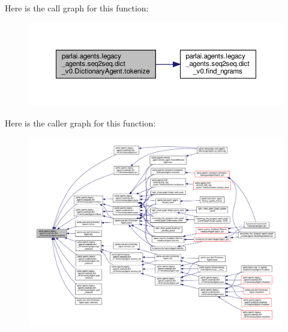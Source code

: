Here is the call graph for this function\+:
\nopagebreak
\begin{figure}[H]
\begin{center}
\leavevmode
\includegraphics[width=350pt]{classparlai_1_1agents_1_1legacy__agents_1_1seq2seq_1_1dict__v0_1_1DictionaryAgent_aa551af633278b71b0a8da65180b79202_cgraph}
\end{center}
\end{figure}
Here is the caller graph for this function\+:
\nopagebreak
\begin{figure}[H]
\begin{center}
\leavevmode
\includegraphics[width=350pt]{classparlai_1_1agents_1_1legacy__agents_1_1seq2seq_1_1dict__v0_1_1DictionaryAgent_aa551af633278b71b0a8da65180b79202_icgraph}
\end{center}
\end{figure}
\mbox{\label{classparlai_1_1agents_1_1legacy__agents_1_1seq2seq_1_1dict__v0_1_1DictionaryAgent_a5d89ed4dcebcd41853bd0614d30337e7}} 
